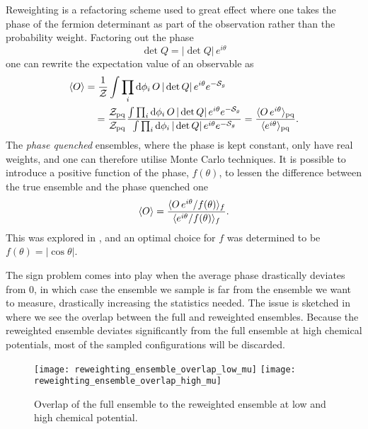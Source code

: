 Reweighting is a refactoring scheme used to great effect where one takes the
phase of the fermion determinant as part of the observation rather than the
probability weight. Factoring out the phase
%
\begin{equation}
  \det Q = |\det Q| \, e^{i\theta}
\end{equation}
%
one can rewrite the expectation value of an observable as
%
\begin{align}
  \langle O \rangle  &=
  \frac{1}{\mathcal{Z}}\int \prod_i \mathrm{d} \phi_i \, O \, | \det
    Q | \, e^{i \theta} e^{-\mathcal{S}_g} \nonumber\\
  & \hskip1em = \frac{\mathcal{Z}_{\text{pq}}}{\mathcal{Z}_{\text{pq}}}
  \frac{\int \prod_i \mathrm{d} \phi_i \, O \, | \det
    Q | \, e^{i \theta} e^{-\mathcal{S}_g}}{%
  \int \prod_i \mathrm{d} \phi_i \, | \det
    Q | \, e^{i \theta} e^{-\mathcal{S}_g}}
  = \frac{\langle O \, e^{i\theta} \rangle_{\text{pq}}}{\langle e^{i\theta} \rangle_{\text{pq}}} .
\end{align}
%
The \emph{phase quenched} ensembles, where the phase is kept constant, only have
real weights, and one can therefore utilise Monte Carlo techniques. It is
possible to introduce a positive function of the phase, $f(\theta)$, to lessen
the difference between the true ensemble and the phase quenched one
%
\begin{equation}
  \langle O \rangle
  = \frac{\langle O \, e^{i\theta} / f(\theta) \rangle_f}{%
    \langle e^{i\theta} / f(\theta) \rangle_f} .
\end{equation}
%
This was explored in \citep{deForcrand:2002pa}, and an optimal choice for $f$
was determined to be $f(\theta) = |\cos\theta|$.

The sign problem comes into play when the average phase drastically deviates
from $0$, in which case the ensemble we sample is far from the ensemble we
want to measure, drastically increasing the statistics needed. The issue is
sketched in  where we see the overlap between
the full and reweighted ensembles. Because the reweighted ensemble deviates
significantly from the full ensemble at high chemical potentials, most of the
sampled configurations will be discarded.

\begin{figure}
  \texttt{[image: reweighting\_ensemble\_overlap\_low\_mu]}
  \texttt{[image: reweighting\_ensemble\_overlap\_high\_mu]}
  \caption{Overlap of the full ensemble to the reweighted ensemble at low and
    high chemical potential.}
  \label{fig-reweighting-overlap}
\end{figure}

